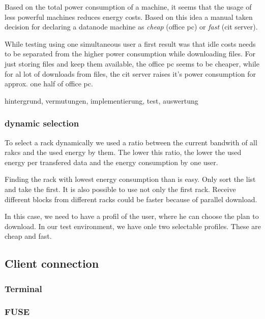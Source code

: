 Based on the total power consumption of a machine, it seems that the usage of less powerful machines reduces energy costs. Based on this idea a manual taken decision for declaring a datanode machine as \textit{cheap} (office pc) or \textit{fast} (cit server). 

While testing using one simultaneous user a first result was that idle costs needs to be separated from the higher power consumption while downloading files. For just storing files and keep them available, the office pc seems to be cheaper, while for al lot of downloads from files, the cit server raises it's power consumption for approx. one half of office pc.



hintergrund, vermutungen, implementierung, test, auswertung

\subsubsection{dynamic selection}

To select a rack dynamically we used a ratio between the current bandwith of all rakcs and the used energy by them. The lower this ratio, the lower the used energy per transfered data and the energy consumption by one user.

Finding the rack with lowest energy consumption than is easy. Only sort the list and take the first. It is also possible to use not only the first rack. Receive different blocks from different racks could be faster because of parallel download.

In this case, we need to have a profil of the user, where he can choose the plan to download. In our test environment, we have onle two selectable profiles. These are cheap and fast.

\subsection{Client connection}
\label{sec:hdfs_client}
\subsubsection{Terminal}
\subsubsection{FUSE}


